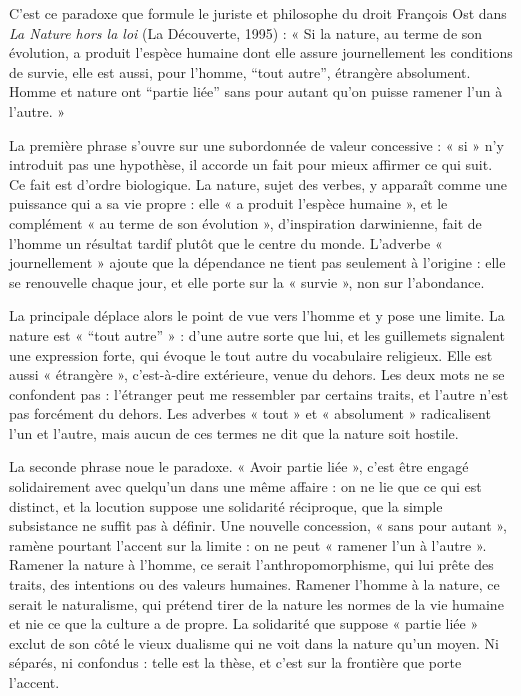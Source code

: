 \documentclass[11pt,a4paper]{article}
\begin{document}
C'est ce paradoxe que formule le juriste et philosophe du droit François Ost dans \emph{La Nature hors la loi} (La Découverte, 1995) : « Si la nature, au terme de son évolution, a produit l'espèce humaine dont elle assure journellement les conditions de survie, elle est aussi, pour l'homme, ``tout autre'', étrangère absolument. Homme et nature ont ``partie liée'' sans pour autant qu'on puisse ramener l'un à l'autre. »

La première phrase s'ouvre sur une subordonnée de valeur concessive : « si » n'y introduit pas une hypothèse, il accorde un fait pour mieux affirmer ce qui suit. Ce fait est d'ordre biologique. La nature, sujet des verbes, y apparaît comme une puissance qui a sa vie propre : elle « a produit l'espèce humaine », et le complément « au terme de son évolution », d'inspiration darwinienne, fait de l'homme un résultat tardif plutôt que le centre du monde. L'adverbe « journellement » ajoute que la dépendance ne tient pas seulement à l'origine : elle se renouvelle chaque jour, et elle porte sur la « survie », non sur l'abondance.

La principale déplace alors le point de vue vers l'homme et y pose une limite. La nature est « ``tout autre'' » : d'une autre sorte que lui, et les guillemets signalent une expression forte, qui évoque le tout autre du vocabulaire religieux. Elle est aussi « étrangère », c'est-à-dire extérieure, venue du dehors. Les deux mots ne se confondent pas : l'étranger peut me ressembler par certains traits, et l'autre n'est pas forcément du dehors. Les adverbes « tout » et « absolument » radicalisent l'un et l'autre, mais aucun de ces termes ne dit que la nature soit hostile.

La seconde phrase noue le paradoxe. « Avoir partie liée », c'est être engagé solidairement avec quelqu'un dans une même affaire : on ne lie que ce qui est distinct, et la locution suppose une solidarité réciproque, que la simple subsistance ne suffit pas à définir. Une nouvelle concession, « sans pour autant », ramène pourtant l'accent sur la limite : on ne peut « ramener l'un à l'autre ». Ramener la nature à l'homme, ce serait l'anthropomorphisme, qui lui prête des traits, des intentions ou des valeurs humaines. Ramener l'homme à la nature, ce serait le naturalisme, qui prétend tirer de la nature les normes de la vie humaine et nie ce que la culture a de propre. La solidarité que suppose « partie liée » exclut de son côté le vieux dualisme qui ne voit dans la nature qu'un moyen. Ni séparés, ni confondus : telle est la thèse, et c'est sur la frontière que porte l'accent.
\end{document}
